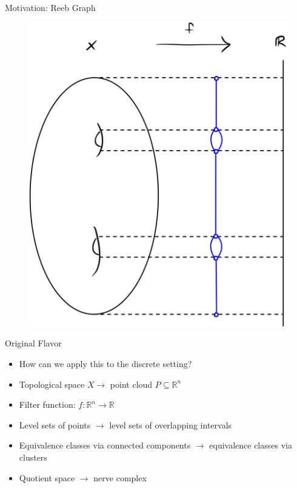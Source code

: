\documentclass{beamer}
\begin{document}
\begin{frame}{Motivation: Reeb Graph}
  \begin{figure}
    \begin{center}
      \hspace*{-1cm}\includegraphics[width=.62\textwidth]{reeb.png}
    \end{center}
  \end{figure}
\end{frame}

\begin{frame}{Original Flavor}
\begin{itemize}
  \item How can we apply this to the discrete setting?
  \item Topological space $X \to$ point cloud $P \subseteq\mathbb{R}^n$
  \item Filter function: $f: \mathbb{R}^n\to\mathbb{R}$
  \item Level sets of points $\to$ level sets of overlapping intervals
  \item Equivalence classes via connected components $\to$ equivalence classes via clusters
  \item Quotient space $\to$ nerve complex
\end{itemize}
\end{frame}
\end{document}
